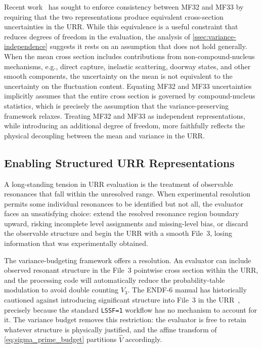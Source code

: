 \documentclass{style/nseJournal}
\begin{document}
Recent work~\cite{barry-rh} has sought to enforce consistency between MF32 and MF33 by requiring that the two representations produce equivalent cross-section uncertainties in the URR. While this equivalence is a useful constraint that reduces degrees of freedom in the evaluation, the analysis of \autoref{ssec:variance-independence} suggests it rests on an assumption that does not hold generally. When the mean cross section includes contributions from non-compound-nucleus mechanisms, e.g., direct capture, inelastic scattering, doorway states, and other smooth components, the uncertainty on the mean is not equivalent to the uncertainty on the fluctuation content. Equating MF32 and MF33 uncertainties implicitly assumes that the entire cross section is governed by compound-nucleus statistics, which is precisely the assumption that the variance-preserving framework relaxes. Treating MF32 and MF33 as independent representations, while introducing an additional degree of freedom, more faithfully reflects the physical decoupling between the mean and variance in the URR.

\subsection{Enabling Structured URR Representations}
\label{ssec:structured-urr-motivation}

A long-standing tension in URR evaluation is the treatment of observable resonances that fall within the unresolved range. When experimental resolution permits some individual resonances to be identified but not all, the evaluator faces an unsatisfying choice: extend the resolved resonance region boundary upward, risking incomplete level assignments and missing-level bias, or discard the observable structure and begin the URR with a smooth File~3, losing information that was experimentally obtained.

The variance-budgeting framework offers a resolution. An evaluator can include observed resonant structure in the File~3 pointwise cross section within the URR, and the processing code will automatically reduce the probability-table modulation to avoid double counting $V_3$. The ENDF-6 manual has historically cautioned against introducing significant structure into File~3 in the URR~\cite{endf-manual}, precisely because the standard \texttt{LSSF=1} workflow has no mechanism to account for it. The variance budget removes this restriction: the evaluator is free to retain whatever structure is physically justified, and the affine transform of \autoref{eq:sigma_prime_budget} partitions $\hat{V}$ accordingly.
\end{document}
